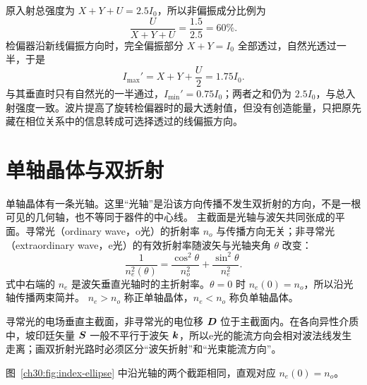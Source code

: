 \begin{xesolution}
原入射总强度为 $X+Y+U=2.5I_0$，所以非偏振成分比例为
\[
 \boxed{\frac{U}{X+Y+U}=\frac{1.5}{2.5}=60\%}.
\]
检偏器沿新线偏振方向时，完全偏振部分 $X+Y=I_0$ 全部透过，自然光透过一半，于是
\[
 \boxed{I_{\max}'=X+Y+\frac U2=1.75I_0}.
\]
与其垂直时只有自然光的一半通过，$I_{\min}'=0.75I_0$；两者之和仍为 $2.5I_0$，与总入射强度一致。波片提高了旋转检偏器时的最大透射值，但没有创造能量，只把原先藏在相位关系中的信息转成可选择透过的线偏振方向。
\end{xesolution}


\section{单轴晶体与双折射}



单轴晶体有一条光轴。这里“光轴”是沿该方向传播不发生双折射的方向，不是一根可见的几何轴，也不等同于器件的中心线。
主截面是光轴与波矢共同张成的平面。寻常光（ordinary wave，o光）的折射率 $n_o$ 与传播方向无关；非寻常光（extraordinary wave，e光）的有效折射率随波矢与光轴夹角 $\theta$ 改变：
\begin{equation}
 \frac1{n_e^2(\theta)}
 =\frac{\cos^2\theta}{n_o^2}+\frac{\sin^2\theta}{n_e^2}.
\end{equation}
式中右端的 $n_e$ 是波矢垂直光轴时的主折射率。$\theta=0$ 时 $n_e(0)=n_o$，所以沿光轴传播两束简并。
$n_e>n_o$ 称正单轴晶体，$n_e<n_o$ 称负单轴晶体。

寻常光的电场垂直主截面，非寻常光的电位移 $\bm{D}$ 位于主截面内。在各向异性介质中，坡印廷矢量
$\bm{S}$ 一般不平行于波矢 $\bm{k}$，所以e光的能流方向会相对波法线发生走离；画双折射光路时必须区分“波矢折射”和“光束能流方向”。

\begin{center}\begin{minipage}{\linewidth}\centering
{}
\end{minipage}\end{center}
图~\ref{ch30:fig:index-ellipse} 中沿光轴的两个截距相同，直观对应 $n_e(0)=n_o$。

